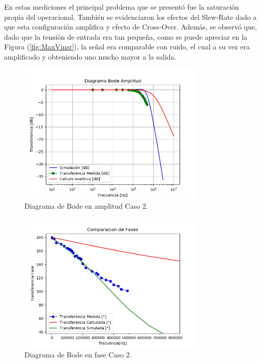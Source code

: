 En estas mediciones el principal problema que se presentó fue la saturación propia del operacional. También se evidenciaron los efectos del Slew-Rate dado a que esta configuración amplifica y efecto de Cross-Over. Además, se observó que, dado que la tensión de entrada era tan pequeña, como se puede apreciar en la Figura (\ref{fig:MaxVinsr}), la señal era comparable con ruido, el cual a su vez era amplificado y obteniendo uno mucho mayor a la salida.
\begin{figure}[H]	
	\centering
	\includegraphics[width=0.8\textwidth]{Ejercicio1/Imagenes/BodeC2.png}
	\caption{Diagrama de Bode en amplitud Caso 2.}
	\label{fig:BodeC2}
\end{figure} 
\begin{figure}[H]	
	\centering
	\includegraphics[width=0.8\textwidth]{Ejercicio1/Imagenes/BodephC2.png}
	\caption{Diagrama de Bode en fase Caso 2.}
	\label{fig:BodephC2}
\end{figure} 



